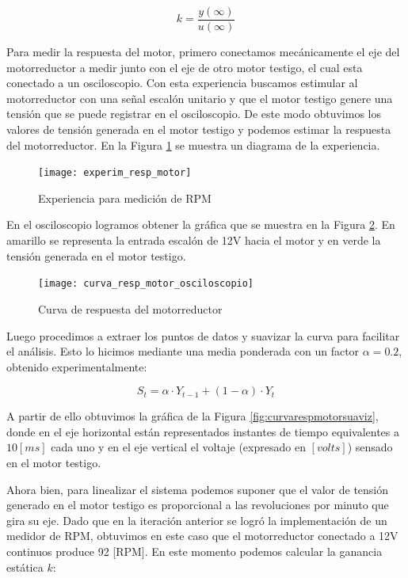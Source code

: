 $$ k=\frac{y(\infty)}{u(\infty)} $$

Para medir la respuesta del motor, primero conectamos mecánicamente el eje del motorreductor a medir junto con el eje de otro motor testigo, el cual esta conectado a un osciloscopio. Con esta experiencia buscamos estimular al motorreductor con una señal escalón unitario y que el motor testigo genere una tensión que se puede registrar en el osciloscopio. De este modo obtuvimos los valores de tensión generada en el motor testigo y podemos estimar la respuesta del motorreductor. En la Figura \ref{fig:exprespmotor} se muestra un diagrama de la experiencia.

\begin{figure}[H]
    \centering
    \texttt{[image: experim\_resp\_motor]}
    \caption{Experiencia para medición de RPM}
    \label{fig:exprespmotor}
\end{figure}

En el osciloscopio logramos obtener la gráfica que se muestra en la Figura \ref{fig:curvarespmotor}. En amarillo se representa la entrada escalón de 12V hacia el motor y en verde la tensión generada en el motor testigo.

\begin{figure}[H]
    \centering
    \texttt{[image: curva\_resp\_motor\_osciloscopio]}
    \caption{Curva de respuesta del motorreductor}
    \label{fig:curvarespmotor}
\end{figure}

Luego procedimos a extraer los puntos de datos y suavizar la curva para facilitar el análisis. Esto lo hicimos mediante una media ponderada con un factor $\alpha = 0.2$, obtenido experimentalmente:

$$ S_{t} = \alpha \cdot Y_{t-1} + (1 - \alpha) \cdot Y_{t} $$

A partir de ello obtuvimos la gráfica de la Figura \ref{fig:curvarespmotorsuaviz}, donde en el eje horizontal están representados instantes de tiempo equivalentes a $10[ms]$ cada uno y en el eje vertical el voltaje (expresado en $[volts]$) sensado en el motor testigo.

Ahora bien, para linealizar el sistema podemos suponer que el valor de tensión generado en el motor testigo es proporcional a las revoluciones por minuto que gira su eje. Dado que en la iteración anterior se logró la implementación de un medidor de RPM, obtuvimos en este caso que el motorreductor conectado a 12V continuos produce 92 [RPM]. En este momento podemos calcular la ganancia estática $k$:

